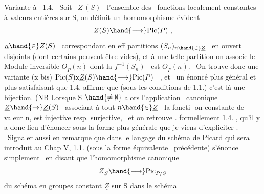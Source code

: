Variante à \ 1.4. \ Soit \ $\underline{Z}\,(S)$ \ l'ensemble des \ fonctions localement
constantes à valeurs entières sur S, on définit un homomorphisme évident
\[ Z(S) \hand{\longrightarrow} \mathrm{Pic}(P) \ , \]
  $\underline{n} \hand{\in} Z(S)$ \ correspondant en eff   partitions $(S_n)_{n\hand{\in}\underline{Z}}$ \ en ouvert
disjoints (dont certains peuvent être vides),  et  à une
telle partition on associe le Module inversible $\underline{O}_P(\underline{n})$ dont la  
$f^{-1}(S_n)$ \ est $\underline{O}_P(n)$. \ On trouve donc une variante
(x bis) \hfill $\mathrm{Pic}(S)\mathrm{x}\underline{Z}(S) \hand{\longrightarrow} \mathrm{Pic}(P)$ \ , \hfill
et \ un énoncé plus général et plus satisfaisant que 1.4. affirme que
(sous les conditions de 1.1.) c'est là une bijection. (NB Lorsque S $\hand{\neq \emptyset}$
alors l'application \ canonique $\underline{Z} \hand{\to} \underline{Z}(S)$ \ associant à tout $n \hand{\in} \underline{Z}$ \ la foncti-%
on constante de valeur n, est injective resp. surjective, \ et on retrouve .
formellement 1.4. , qu'il y a donc lieu d'énoncer sous la forme plus
générale que je viens d'expliciter . \ Signaler aussi en remarque que
dans le langage du schéma de Picard qui sera introduit au Chap V, 1.1.
(sous la forme équivalente \ précédente) s'énonce simplement \ en disant que
l'homomorphisme canonique
\[ \underline{Z}_S \hand{\longrightarrow} \underline{\mathrm{Pic}}_{P/S} \]
du schéma en groupes constant  $\underline{Z}$ sur S dans le schéma

